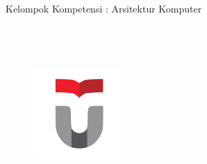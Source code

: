 \begin{titlepage}
    \begin{center}
        \vspace*{1.0cm}
        \bo{\Judul} \\[1.0cm]
        \bo{\Type} \\
        Kelompok Kompetensi : Arsitektur Komputer \\[1.0cm]
		\\[1.0cm]
        \bo{\Penulis} \\
        \bo{\npm} \\

		\begin{figure}
			\begin{center}
				\includegraphics[width=3.5cm]{pics/telu.png}
			\end{center}
		\end{figure}    

    \end{center}
\end{titlepage}